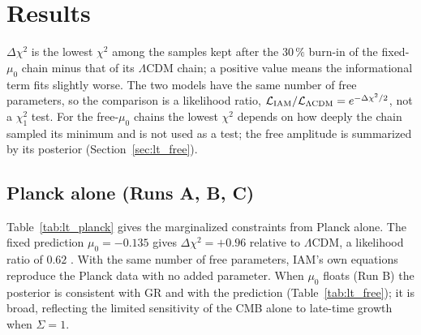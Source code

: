 \section{Results}\label{sec:lt_results}
$\Delta\chi^2$ is the lowest $\chi^2$ among the samples kept after the $30\,\%$ burn-in of the fixed-$\mu_0$ chain minus that of its $\Lambda$CDM chain; a positive value means the informational
term fits slightly worse. The two models have the same number of free parameters, so the comparison is a likelihood ratio,
$\mathcal L_{\rm IAM}/\mathcal L_{\Lambda\rm CDM}=e^{-\Delta\chi^2/2}$, not a $\chi^2_1$ test. For the free-$\mu_0$ chains the lowest $\chi^2$ depends on
how deeply the chain sampled its minimum and is not used as a test; the free amplitude is summarized by its posterior
(Section~\ref{sec:lt_free}).

\subsection{Planck alone (Runs A, B, C)}
Table~\ref{tab:lt_planck} gives the marginalized constraints from Planck alone. The fixed prediction $\mu_0=-0.135$ gives $\Delta\chi^2=+0.96$
relative to $\Lambda$CDM, a likelihood ratio of $0.62$ \measured. With the same number of free parameters, IAM's own equations reproduce the Planck data with no added parameter.
When $\mu_0$ floats (Run B) the posterior is consistent with GR and with the prediction (Table~\ref{tab:lt_free}); it is broad, reflecting the limited
sensitivity of the CMB alone to late-time growth when $\Sigma=1$.

